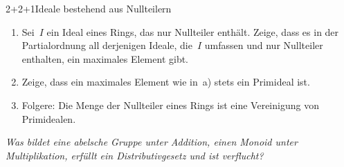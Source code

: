 \documentclass{uebblatt}
\begin{document}
\begin{aufgabe}{2+2+1}{Ideale bestehend aus Nullteilern}
\begin{enumerate}
\item Sei~$I$ ein Ideal eines Rings, das nur Nullteiler enthält. Zeige, dass es
in der Partialordnung all derjenigen Ideale, die~$I$ umfassen und nur Nullteiler
enthalten, ein maximales Element gibt.
\item Zeige, dass ein maximales Element wie in~a) stets ein Primideal ist.
\item Folgere: Die Menge der Nullteiler eines Rings ist eine Vereinigung von
Primidealen.
\end{enumerate}
\end{aufgabe}

\centering
\emph{Was bildet eine abelsche Gruppe unter Addition, einen Monoid unter
Multiplikation, erfüllt ein Distributivgesetz und ist verflucht?}
\par
\end{document}
